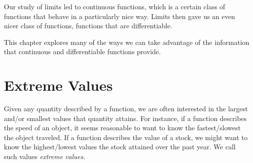 \documentclass[10pt]{book}
\begin{document}
%
%

\mainmatter

\pagestyle{fancy}

\setcounter{chapter}{2}


Our study of limits led to continuous functions, which is a certain class of functions that behave in a particularly nice way. Limits then gave us an even nicer class of functions, functions that are differentiable.

This chapter explores many of the ways we can take advantage of the information that continuous and differentiable functions  provide.

\section{Extreme Values}\label{sec:extreme_values}


Given any quantity described by a function, we are often interested in the largest and/or smallest values that quantity attains. For instance, if a function describes the speed of an object, it seems reasonable to want to know the fastest/slowest the object traveled. If a function describes the value of a stock, we might want to know the highest/lowest values the stock attained over the past year. We call such values \textit{extreme values.}

%

%



%
%
\end{document}
